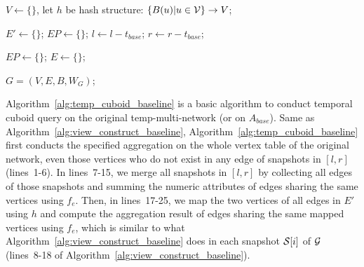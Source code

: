 \documentclass[10pt,journal,compsoc]{IEEEtran}
\begin{document}
\begin{algorithm}[t]
	\scriptsize
	\caption{$\kw{Temporal Cuboid Query}$}
	\label{alg:temp_cuboid_baseline}
	$V \leftarrow \{\}$, let $h$ be hash structure: $\{B(u)|u \in \mathcal{V}\} \rightarrow V$;
	
	$E' \leftarrow \{\}$;
	$EP \leftarrow \{\}$;
	$ l \gets l-t_{base} $;
	$ r \gets r-t_{base} $;
	
	$EP \leftarrow \{\}$;
	$ E \gets \{\} $;
	
	\Return $ G=(V,E,B,W_{G}) $;
\end{algorithm}
Algorithm~\ref{alg:temp_cuboid_baseline} is a basic algorithm to conduct temporal cuboid query on the original temp-multi-network (or on $ A_{base} $). Same as Algorithm~\ref{alg:view_construct_baseline}, Algorithm~\ref{alg:temp_cuboid_baseline} first conducts the specified aggregation on the whole vertex table of the original network, even those vertices who do not exist in any edge of snapshots in $[l,r]$ (lines~1-6). In lines~7-15, we merge all snapshots in $[l,r]$ by collecting all edges of those snapshots and summing the numeric attributes of edges sharing the same vertices using $ f_e $. Then, in lines~17-25, we map the two vertices of all edges in $ E' $ using $ h $ and compute the aggregation result of edges sharing the same mapped vertices using $ f_e $, which is similar to what Algorithm~\ref{alg:view_construct_baseline} does in each snapshot $ \mathcal{S}[i] $ of $ \mathcal{G} $ (lines~8-18 of Algorithm~\ref{alg:view_construct_baseline}).
\end{document}
